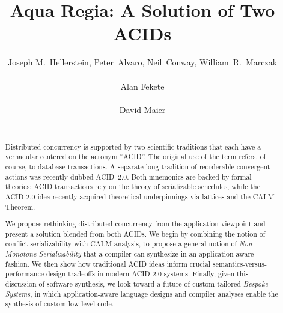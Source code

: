 \documentclass{sig-alternate}
\begin{document}

\title{{\ttlit Aqua Regia}: A Solution of Two ACIDs}
\author{
\alignauthor
Joseph M.~Hellerstein, Peter~Alvaro, Neil~Conway, William~R.~Marczak\\
       \\
\alignauthor
Alan Fekete\\
       \\
\alignauthor
David Maier\\
       \\
}

\maketitle
\begin{abstract}
  Distributed concurrency is supported by two scientific traditions that each
  have a vernacular centered on the acronym ``ACID''.  The original use of
  the term refers, of course, to database transactions. A separate long
  tradition of reorderable convergent actions was recently dubbed
  ACID~2.0.  Both mnemonics are backed by formal theories:
  ACID transactions rely on the theory of serializable schedules, while the ACID
  2.0 idea recently acquired theoretical underpinnings via lattices and the CALM
  Theorem.

  We propose rethinking distributed concurrency from the application viewpoint
  and present a solution blended from both ACIDs.  We begin by combining the
  notion of conflict serializability with CALM analysis, to propose a general
  notion of \emph{Non-Monotone Serializability} that a compiler can synthesize
  in an application-aware fashion.  We then show how traditional ACID ideas
  inform crucial semantics-versus-performance design tradeoffs in modern ACID
  2.0 systems.  Finally, given this discussion of software synthesis, we look
  toward a future of custom-tailored \emph{Bespoke Systems}, in which
  application-aware language designs and compiler analyses enable the synthesis
  of custom low-level code.
\end{abstract}
\end{document}
